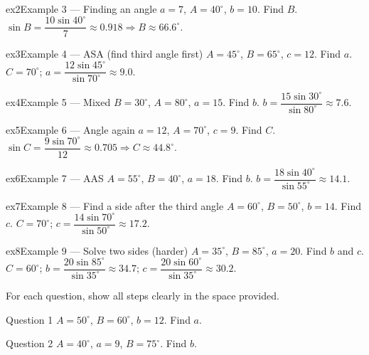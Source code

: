 \documentclass[11pt]{article}
\begin{document}
\begin{example}{ex2}{Example 3 --- Finding an angle}
$a=7$, $A=40^\circ$, $b=10$. Find $B$.
\soln $\sin B=\dfrac{10\sin40^\circ}{7}\approx0.918\Rightarrow B\approx66.6^\circ.$
\end{example}

\begin{example}{ex3}{Example 4 --- ASA (find third angle first)}
$A=45^\circ$, $B=65^\circ$, $c=12$. Find $a$.
\soln $C=70^\circ$; $a=\dfrac{12\sin45^\circ}{\sin70^\circ}\approx9.0.$
\end{example}

\begin{example}{ex4}{Example 5 --- Mixed}
$B=30^\circ$, $A=80^\circ$, $a=15$. Find $b$.
\soln $b=\dfrac{15\sin30^\circ}{\sin80^\circ}\approx7.6.$
\end{example}

\begin{example}{ex5}{Example 6 --- Angle again}
$a=12$, $A=70^\circ$, $c=9$. Find $C$.
\soln $\sin C=\dfrac{9\sin70^\circ}{12}\approx0.705\Rightarrow C\approx44.8^\circ.$
\end{example}

\begin{example}{ex6}{Example 7 --- AAS}
$A=55^\circ$, $B=40^\circ$, $a=18$. Find $b$.
\soln $b=\dfrac{18\sin40^\circ}{\sin55^\circ}\approx14.1.$
\end{example}

\begin{example}{ex7}{Example 8 --- Find a side after the third angle}
$A=60^\circ$, $B=50^\circ$, $b=14$. Find $c$.
\soln $C=70^\circ$; $c=\dfrac{14\sin70^\circ}{\sin50^\circ}\approx17.2.$
\end{example}

\begin{example}{ex8}{Example 9 --- Solve two sides (harder)}
$A=35^\circ$, $B=85^\circ$, $a=20$. Find $b$ and $c$.
\soln $C=60^\circ$; $b=\dfrac{20\sin85^\circ}{\sin35^\circ}\approx34.7$; $c=\dfrac{20\sin60^\circ}{\sin35^\circ}\approx30.2.$
\end{example}

\clearpage
{}
For each question, show all steps clearly in the space provided.

\begin{qbox}{Question 1}
$A=50^\circ$, $B=60^\circ$, $b=12$. Find $a$.\workspace{2.2cm}
\end{qbox}

\begin{qbox}{Question 2}
$A=40^\circ$, $a=9$, $B=75^\circ$. Find $b$.\workspace{2.2cm}
\end{qbox}
\end{document}
